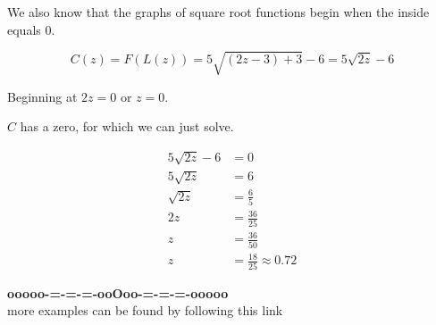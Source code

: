 \documentclass{ximera}
\begin{document}
\begin{example}
\begin{image}
\end{image}





We also know that the graphs of square root functions begin when the inside equals $0$. 

\[
C(z) = F(L(z)) = 5 \sqrt{(2z - 3) + 3} - 6 = 5 \sqrt{2z} - 6
\]


Beginning at $2z = 0$ or $z = 0$. 

$C$ has a zero, for which we can just solve.




\begin{align*}
5 \sqrt{2z} - 6 &= 0 \\
5 \sqrt{2z}     &= 6 \\
\sqrt{2z}       &= \frac{6}{5} \\
2z            &= \frac{36}{25}  \\
z                  &= \frac{36}{50} \\
z                 &= \frac{18}{25} \approx 0.72
\end{align*}




\end{example}




















\begin{center}
\textbf{\textcolor{green!50!black}{ooooo-=-=-=-ooOoo-=-=-=-ooooo}} \\

more examples can be found by following this link\\ 

\end{center}
\end{document}
